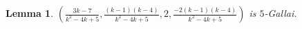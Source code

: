 \documentclass[12pt]{article}
\theoremstyle{plain}
\newtheorem{thm}{Theorem}
\newtheorem{lem}[thm]{Lemma}
\newtheorem{cor}[thm]{Corollary}
\theoremstyle{definition}
\newtheorem{defn}{Definition}
\theoremstyle{remark}
\newcommand{\fancy}[1]{\mathcal{#1}}
\newcommand{\IN}{\mathbb{N}}
\newcommand{\IR}{\mathbb{R}}
\renewcommand{\L}{\fancy{L}}
\newcommand{\HH}{\fancy{H}}
\newcommand{\card}[1]{\left|#1\right|}
\newcommand{\size}[1]{\left\Vert#1\right\Vert}
\newcommand{\func}[3]{#1\colon #2 \rightarrow #3}
\newcommand{\parens}[1]{\left( #1 \right)}
\newcommand{\DefinedAs}{\mathrel{\mathop:}=}
\begin{document}
%
%
%

\begin{lem}\label{Gallai7Up}
$\parens{\frac{3k-7}{k^2-4k+5}, \frac{(k-1)(k-4)}{k^2-4k+5}, 2, \frac{-2(k-1)(k-4)}{k^2-4k+5}}$ is $5$-Gallai.
\end{lem}
\end{document}
